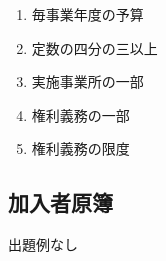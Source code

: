 \begin{answerbox}
  \begin{enumerate}[A:]
    \item 毎事業年度の予算
    \item 定数の四分の三以上
    \item 実施事業所の一部
    \item 権利義務の一部
    \item 権利義務の限度
  \end{enumerate}
\end{answerbox}

\newpage

\subsection{加入者原簿}

出題例なし